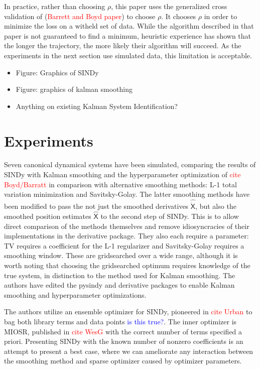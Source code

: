 \documentclass{article}
\newcommand{\red}[1]{\textcolor{red}{#1}}
\newcommand{\blue}[1]{\textcolor{blue}{#1}}
\newcommand{\mat}[1]{\boldsymbol{\mathsf{#1}}}
\begin{document}
In practice, rather than choosing $\rho$, this paper uses the generalized cross validation of (\red{Barrett and Boyd paper}) to choose $\rho$.  It chooses $\rho$ in order to minimize the loss on a witheld set of data.  While the algorithm described in that paper is not guaranteed to find a minimum, heuristic experience has shown that the longer the trajectory, the more likely their algorithm will succeed.  As the experiments in the next section use simulated data, this limitation is acceptable.


\begin{itemize}
    \item Figure: Graphics of SINDy
    \item Figure: graphics of kalman smoothing
    \item Anything on existing Kalman System Identification?
\end{itemize}

\section{Experiments}

Seven canonical dynamical systems have been simulated, comparing the results of SINDy with Kalman smoothing and the hyperparameter optimization of \red{cite Boyd/Barratt} in comparison with alternative smoothing methods: L-1 total variation minimization and Savitsky-Golay.  The latter smoothing methods have been modified to pass the not just the smoothed derivatives $\mat{\widehat{\dot X}}$, but also the smoothed position estimates $\mat {\widehat X}$ to the second step of SINDy.  This is to allow direct comparison of the methods themselves and remove idiosyncracies of their implementations in the derivative package.  They also each require a parameter: TV requires a coefficient for the L-1 regularizer and Savitsky-Golay requires a smoothing window.  These are gridsearched over a wide range, although it is worth noting that choosing the gridsearched optimum requires knowledge of the true system, in distinction to the method used for Kalman smoothing.  The authors have edited the pysindy and derivative packages to enable Kalman smoothing and hyperparameter optimizations.

The authors utilize an ensemble optimizer for SINDy, pioneered in \red{cite Urban} to bag both library terms and data points \blue{is this true?}.  The inner optimizer is MIOSR, published in \red{cite WesG} with the correct number of terms specified a priori.  Presenting SINDy with the known number of nonzero coefficients is an attempt to present a best case, where we can ameliorate any interaction between the smoothing method and sparse optimizer caused by optimizer parameters.
\end{document}
